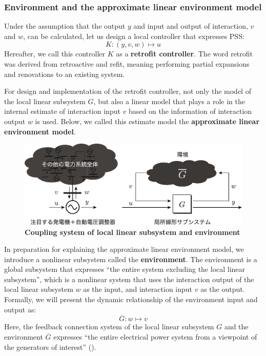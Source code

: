 \documentclass[tombow,dvipdfmx]{corona-a5-1.1}
\begin{document}
\smallskip
\subsubsection{Environment and the approximate linear environment model}

Under the assumption that the output $y$ and input and output of interaction, $v$ and $w$, can be calculated, let us design a local controller that expresses PSS:
\[
K : (y,v,w)\mapsto u
\]
Hereafter, we call this controller $K$ as a \textbf{retrofit controller}.
The word retrofit was derived from retroactive and refit, meaning performing partial expansions and renovations to an existing system.

For design and implementation of the retrofit controller, not only the model of the local linear subsystem $G$, but also a linear model that plays a role in the internal estimate of interaction input $v$ based on the information of interaction output $w$ is used.
Below, we called this estimate model the \textbf{approximate linear environment model}.

\begin{figure}[t]
\centering
\includegraphics[width = .99\linewidth]{figs/retconsys2}
\medskip
\caption{\textbf{Coupling system of local linear subsystem and environment}}
\label{fig:retconsys}
\medskip
\end{figure}


In preparation for explaining the approximate linear environment model, we introduce a nonlinear subsystem called the \textbf{environment}.
The environment is a global subsystem that expresses “the entire system excluding the local linear subsystem”, which is a nonlinear system that uses the interaction output of the local linear subsystem $w$ as the input, and interaction input $v$ as the output.
Formally, we will present the dynamic relationship of the environment input and output as:
\[
\overline{G} : w\mapsto v
\]
Here, the feedback connection system of the local linear subsystem $G$ and the environment $\overline{G}$ expresses “the entire electrical power system from a viewpoint of the generators of interest” ().
\end{document}
